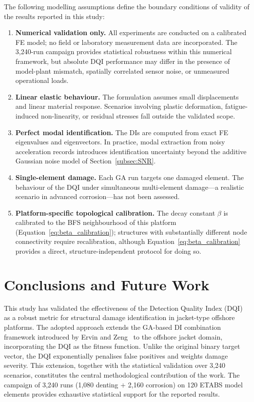 \documentclass[preprint,12pt]{elsarticle}
\begin{document}
The following modelling assumptions define the boundary conditions of validity of the results reported in this study:

\begin{enumerate}
    \item \textbf{Numerical validation only.} All experiments are conducted on a calibrated FE model; no field or laboratory measurement data are incorporated. The 3{,}240-run campaign provides statistical robustness within this numerical framework, but absolute DQI performance may differ in the presence of model-plant mismatch, spatially correlated sensor noise, or unmeasured operational loads.
    \item \textbf{Linear elastic behaviour.} The formulation assumes small displacements and linear material response. Scenarios involving plastic deformation, fatigue-induced non-linearity, or residual stresses fall outside the validated scope.
    \item \textbf{Perfect modal identification.} The DIs are computed from exact FE eigenvalues and eigenvectors. In practice, modal extraction from noisy acceleration records introduces identification uncertainty beyond the additive Gaussian noise model of Section~\ref{subsec:SNR}.
    \item \textbf{Single-element damage.} Each GA run targets one damaged element. The behaviour of the DQI under simultaneous multi-element damage---a realistic scenario in advanced corrosion---has not been assessed.
    \item \textbf{Platform-specific topological calibration.} The decay constant $\beta$ is calibrated to the BFS neighbourhood of this platform (Equation~\ref{eq:beta_calibration}); structures with substantially different node connectivity require recalibration, although Equation~\ref{eq:beta_calibration} provides a direct, structure-independent protocol for doing so.
\end{enumerate}

\section{Conclusions and Future Work}
\label{sec:conclusiones}

This study has validated the effectiveness of the Detection Quality Index (DQI) as a robust metric for structural damage identification in jacket-type offshore platforms. The adopted approach extends the GA-based DI combination framework introduced by Ervin and Zeng~\citep{ervin2022index} to the offshore jacket domain, incorporating the DQI as the fitness function. Unlike the original binary target vector, the DQI exponentially penalises false positives and weights damage severity. This extension, together with the statistical validation over 3{,}240 scenarios, constitutes the central methodological contribution of the work. The campaign of 3{,}240 runs (1{,}080 denting $+$ 2{,}160 corrosion) on 120 ETABS model elements provides exhaustive statistical support for the reported results.
\end{document}
